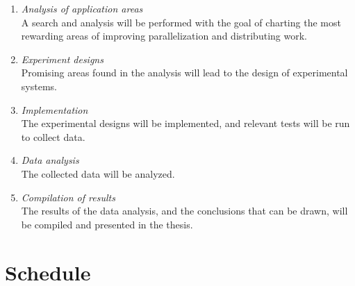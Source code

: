 \documentclass{article}
\begin{document}
\begin{enumerate}
   \item{}\textit{Analysis of application areas}\\
     A search and
     analysis will be performed with the goal of charting the most
     rewarding areas of improving parallelization and distributing
     work.
   \item{}\textit{Experiment designs}\\
     Promising areas found in the analysis will lead to the design of
     experimental systems.
   \item{}\textit{Implementation}\\
     The experimental designs will be implemented, and relevant tests
     will be run to collect data.
   \item{}\textit{Data analysis}\\
     The collected data will be analyzed.
   \item{}\textit{Compilation of results}\\
     The results of the data analysis, and the conclusions that can be
     drawn, will be compiled and presented in the thesis.
\end{enumerate} 
\section{Schedule}
\end{document}
